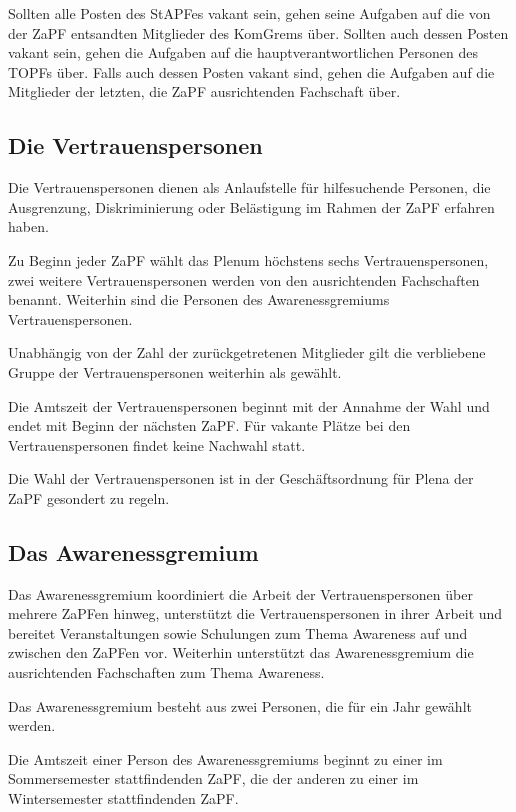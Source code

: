 \documentclass[
  a4paper,
  oneside]{scrartcl}
\begin{document}
Sollten alle Posten des StAPFes vakant sein, gehen seine Aufgaben auf
die von der ZaPF entsandten Mitglieder des KomGrems über. Sollten auch
dessen Posten vakant sein, gehen die Aufgaben auf die
hauptverantwortlichen Personen des TOPFs über. Falls auch dessen Posten
vakant sind, gehen die Aufgaben auf die Mitglieder der letzten, die ZaPF
ausrichtenden Fachschaft über.

\subsection{Die Vertrauenspersonen}\label{die-vertrauenspersonen}

Die Vertrauenspersonen dienen als Anlaufstelle für hilfesuchende
Personen, die Ausgrenzung, Diskriminierung oder Belästigung im Rahmen
der ZaPF erfahren haben.

Zu Beginn jeder ZaPF wählt das Plenum höchstens sechs
Vertrauenspersonen, zwei weitere Vertrauenspersonen werden von den
ausrichtenden Fachschaften benannt. Weiterhin sind die Personen des
Awarenessgremiums Vertrauenspersonen.

Unabhängig von der Zahl der zurückgetretenen Mitglieder gilt die
verbliebene Gruppe der Vertrauenspersonen weiterhin als gewählt.

Die Amtszeit der Vertrauenspersonen beginnt mit der Annahme der Wahl und
endet mit Beginn der nächsten ZaPF. Für vakante Plätze bei den
Vertrauenspersonen findet keine Nachwahl statt.

Die Wahl der Vertrauenspersonen ist in der Geschäftsordnung für Plena
der ZaPF gesondert zu regeln.

\subsection{Das Awarenessgremium}\label{das-awarenessgremium}

Das Awarenessgremium koordiniert die Arbeit der Vertrauenspersonen über
mehrere ZaPFen hinweg, unterstützt die Vertrauenspersonen in ihrer
Arbeit und bereitet Veranstaltungen sowie Schulungen zum Thema Awareness
auf und zwischen den ZaPFen vor. Weiterhin unterstützt das
Awarenessgremium die ausrichtenden Fachschaften zum Thema Awareness.

Das Awarenessgremium besteht aus zwei Personen, die für ein Jahr gewählt
werden.

Die Amtszeit einer Person des Awarenessgremiums beginnt zu einer im
Sommersemester stattfindenden ZaPF, die der anderen zu einer im
Wintersemester stattfindenden ZaPF.
\end{document}
